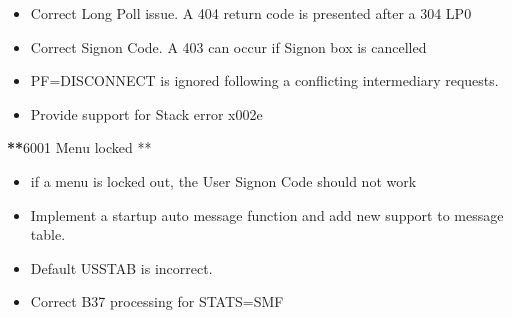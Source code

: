 \documentclass[letterpaper,10pt,english]{sphinxmanual}
\begin{document}
\begin{itemize}
\item {} 
Correct Long Poll issue. A 404 return code is presented after a 304 LP0

\end{itemize}

\begin{itemize}
\item {} 
Correct Signon Code. A 403 can occur if Signon box is cancelled

\end{itemize}

\begin{itemize}
\item {} 
PF=DISCONNECT is ignored following a conflicting intermediary requests.

\end{itemize}

\begin{itemize}
\item {} 
Provide support for Stack error x002e

\end{itemize}

{\color{red}\bfseries{}**}6001 Menu locked **
\begin{itemize}
\item {} 
if a menu is locked out, the User Signon Code should not work

\end{itemize}

\begin{itemize}
\item {} 
Implement a startup auto message function and add new support to message table.

\end{itemize}

\begin{itemize}
\item {} 
Default USSTAB is incorrect.

\end{itemize}

\begin{itemize}
\item {} 
Correct B37 processing for STATS=SMF

\end{itemize}
\end{document}
